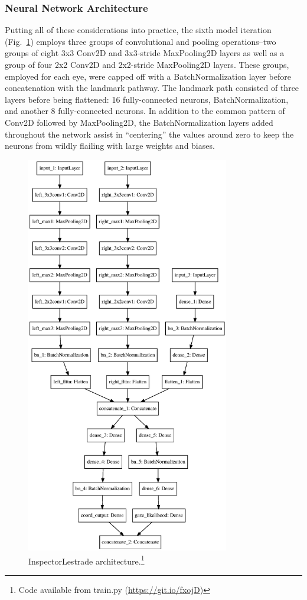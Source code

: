 \documentclass[aip, rsi, amsmath, amssymb, reprint, author-year, longbibliography]{revtex4-1}
\begin{document}
\subsubsection{\label{sec:architecture} Neural Network Architecture}

Putting all of these considerations into practice, the sixth model iteration
(Fig.~\ref{fig:modelv6}) employs three groups of convolutional and pooling
operations--two groups of eight 3x3 Conv2D and 3x3-stride MaxPooling2D layers as
well as a group of four 2x2 Conv2D and 2x2-stride MaxPooling2D layers. These
groups, employed for each eye, were capped off with a BatchNormalization layer
before concatenation with the landmark pathway. The landmark path consisted
of three layers before being flattened: 16 fully-connected neurons,
BatchNormalization, and another 8 fully-connected neurons. In addition to the
common pattern of Conv2D followed by MaxPooling2D, the BatchNormalization layers
added throughout the network assist in ``centering'' the values around zero to
keep the neurons from wildly flailing with large weights and biases.

\begin{figure}
\includegraphics[height=17.5cm]{v6-lestrade.eps}
\caption{\label{fig:modelv6} InspectorLestrade architecture.\footnote{Code
    available from train.py (\url{https://git.io/fxojD})}}
\end{figure}
\end{document}
